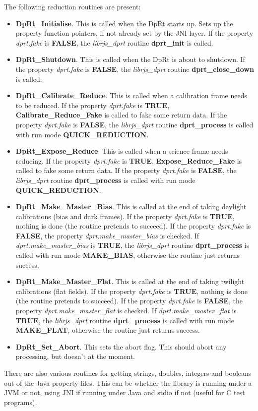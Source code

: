 \documentclass[10pt,a4paper]{article}
\begin{document}
The following reduction routines are present:
\begin{itemize}
\item {\bf DpRt\_Initialise}. This is called when the DpRt starts up. Sets up the property function pointers,
	if not already set by the JNI layer. If the property {\em dprt.fake} is {\bf FALSE}, the {\em librjs\_dprt}
	routine {\bf dprt\_init} is called.
\item {\bf DpRt\_Shutdown}. This is called when the DpRt is about to shutdown. 
	If the property {\em dprt.fake} is {\bf FALSE}, the {\em librjs\_dprt}
	routine {\bf dprt\_close\_down} is called.
\item {\bf DpRt\_Calibrate\_Reduce}. This is called when a calibration frame needs to be reduced. 
	If the property {\em dprt.fake} is {\bf TRUE}, {\bf Calibrate\_Reduce\_Fake} is called to fake some
	return data. 
	If the property {\em dprt.fake} is {\bf FALSE}, the {\em librjs\_dprt} routine {\bf dprt\_process} is called
	with run mode {\bf QUICK\_REDUCTION}.
\item {\bf DpRt\_Expose\_Reduce}. This is called when a science frame needs reducing.
	If the property {\em dprt.fake} is {\bf TRUE}, {\bf Expose\_Reduce\_Fake} is called to fake some return data. 
	If the property {\em dprt.fake} is {\bf FALSE}, the {\em librjs\_dprt} routine {\bf dprt\_process} is called
	with run mode {\bf QUICK\_REDUCTION}.
\item {\bf DpRt\_Make\_Master\_Bias}. This is called at the end of taking daylight calibrations (bias and dark frames).
	If the property {\em dprt.fake} is {\bf TRUE}, nothing is done (the routine pretends to succeed).
	If the property {\em dprt.fake} is {\bf FALSE}, the property {\em dprt.make\_master\_bias} is checked.
	If {\em dprt.make\_master\_bias} is {\bf TRUE}, the {\em librjs\_dprt} routine {\bf dprt\_process} is called
	with run mode {\bf MAKE\_BIAS}, otherwise the routine just returns success.
\item {\bf DpRt\_Make\_Master\_Flat}. This is called at the end of taking twilight calibrations (flat fields).
	If the property {\em dprt.fake} is {\bf TRUE}, nothing is done (the routine pretends to succeed).
	If the property {\em dprt.fake} is {\bf FALSE}, the property {\em dprt.make\_master\_flat} is checked.
	If {\em dprt.make\_master\_flat} is {\bf TRUE}, the {\em librjs\_dprt} routine {\bf dprt\_process} is called
	with run mode {\bf MAKE\_FLAT}, otherwise the routine just returns success.
\item {\bf DpRt\_Set\_Abort}. This sets the abort flag. This should abort any processing, but doesn't at the moment.
\end{itemize}
There are also various routines for getting strings, doubles, integers and booleans out of the Java property
files. This can be whether the library is running under a JVM or not, using JNI if running under Java
and stdio if not (useful for C test programs).
\end{document}
